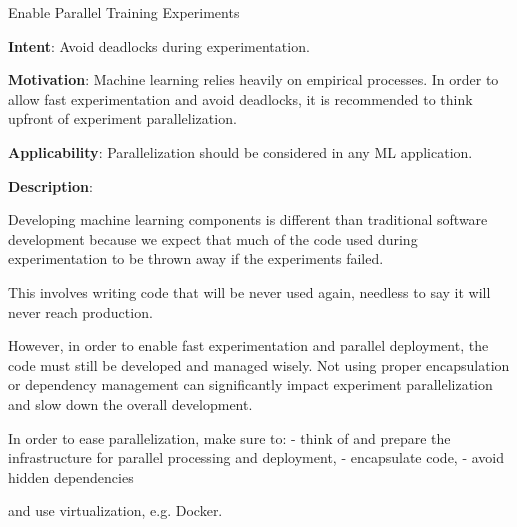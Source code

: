   
  \begin{frame}[plain]{ Enable Parallel Training Experiments
 }

  \textbf{Intent}: Avoid deadlocks during experimentation. 
 

  \textbf{Motivation}: Machine learning relies heavily on empirical processes. In order to allow fast experimentation and avoid deadlocks, it is recommended to think upfront of experiment parallelization. 
 

  \textbf{Applicability}: Parallelization should be considered in any ML application.
 

  \textbf{Description}: 

Developing machine learning components is different than traditional software development because we expect that much of the code used during experimentation to be thrown away if the experiments failed.


This involves writing code that will be never used again, needless to say it will never reach production.


However, in order to enable fast experimentation and parallel deployment, the code must still be developed and managed wisely.
Not using proper encapsulation or dependency management can significantly impact experiment parallelization and slow down the overall development.


In order to ease parallelization, make sure to:
- think of and prepare the infrastructure for parallel processing and deployment,
- encapsulate code,
- avoid hidden dependencies


and use virtualization, e.g. Docker.


 


  \end{frame}

